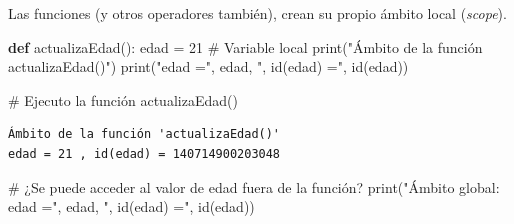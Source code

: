 \documentclass[
  spanish,
  letterpaper,
]{scrbook}
\newenvironment{Shaded}{\begin{snugshade}}{\end{snugshade}}
\newcommand{\BuiltInTok}[1]{\textcolor[rgb]{0.00,0.23,0.31}{#1}}
\newcommand{\CommentTok}[1]{\textcolor[rgb]{0.37,0.37,0.37}{#1}}
\newcommand{\DecValTok}[1]{\textcolor[rgb]{0.68,0.00,0.00}{#1}}
\newcommand{\KeywordTok}[1]{\textcolor[rgb]{0.00,0.23,0.31}{\textbf{#1}}}
\newcommand{\NormalTok}[1]{\textcolor[rgb]{0.00,0.23,0.31}{#1}}
\newcommand{\OperatorTok}[1]{\textcolor[rgb]{0.37,0.37,0.37}{#1}}
\newcommand{\StringTok}[1]{\textcolor[rgb]{0.13,0.47,0.30}{#1}}
\theoremstyle{definition}
\theoremstyle{remark}
\begin{document}
Las funciones (y otros operadores también), crean su propio ámbito local
(\emph{scope}).

\begin{Shaded}
\begin{Highlighting}[]
\KeywordTok{def}\NormalTok{ actualizaEdad():}
\NormalTok{    edad }\OperatorTok{=} \DecValTok{21} \CommentTok{\# Variable local}
    \BuiltInTok{print}\NormalTok{(}\StringTok{"Ámbito de la función \textquotesingle{}actualizaEdad()\textquotesingle{}"}\NormalTok{)}
    \BuiltInTok{print}\NormalTok{(}\StringTok{"edad ="}\NormalTok{, edad, }\StringTok{", id(edad) ="}\NormalTok{, }\BuiltInTok{id}\NormalTok{(edad))}

\CommentTok{\# Ejecuto la función}
\NormalTok{actualizaEdad()}
\end{Highlighting}
\end{Shaded}

\begin{verbatim}
Ámbito de la función 'actualizaEdad()'
edad = 21 , id(edad) = 140714900203048
\end{verbatim}

\begin{Shaded}
\begin{Highlighting}[]
\CommentTok{\# ¿Se puede acceder al valor de \textquotesingle{}edad\textquotesingle{} fuera de la función?}
\BuiltInTok{print}\NormalTok{(}\StringTok{"Ámbito global: edad ="}\NormalTok{, edad, }\StringTok{", id(edad) ="}\NormalTok{, }\BuiltInTok{id}\NormalTok{(edad))}
\end{Highlighting}
\end{Shaded}
\end{document}
